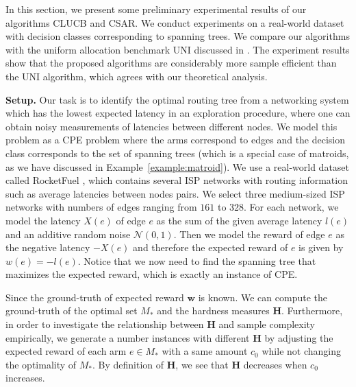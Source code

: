 \documentclass{article}
\newcommand{\Algorithm}{{\small \textsf{CLUCB}}\xspace}
\newcommand{\AlgorithmBud}{{\small \textsf{CSAR}}\xspace}
\newcommand{\Uniform}{{\small \textsf{UNI}}\xspace}
\newcommand{\Problem}{{CPE}\xspace}
\renewcommand{\vec}[1]{\boldsymbol{#1}}
\begin{document}
In this section, we present some preliminary experimental results of our algorithms \Algorithm and \AlgorithmBud. 
We conduct experiments on a real-world dataset with decision classes corresponding to spanning trees.
We compare our algorithms with the uniform allocation benchmark \Uniform discussed in .
The experiment results show that the proposed algorithms are considerably more sample efficient than the \Uniform algorithm, which agrees with our theoretical analysis.


\newcommand{\imgsize}{0.30}

\textbf{Setup.} 
Our task is to identify the optimal routing tree from a networking system which has the lowest expected latency  in an exploration procedure, where one can obtain noisy measurements of latencies between different nodes.
We model this problem as a \Problem problem where the arms correspond to edges and the decision class corresponds to the set of spanning trees (which is a special case of matroids, as we have discussed in Example~\ref{example:matroid}).
We use a real-world dataset called RocketFuel \citep{spring2002measuring}, which contains several ISP networks with routing information such as average latencies between nodes pairs. 
We select three medium-sized ISP networks with numbers of edges ranging from $161$ to 328.
For each network, we model the latency $X(e)$ of edge $e$ as the sum of the given average latency $l(e)$ and an additive random noise $\mathcal N(0, 1)$.
Then we model the reward of edge $e$ as the negative latency $-X(e)$ and therefore the expected reward of $e$ is given by $w(e) = -l(e)$.
Notice that we now need to find the spanning tree that maximizes the expected reward, which is exactly an instance of \Problem. 

Since the ground-truth of expected reward $\vec w$ is known.
We can compute the ground-truth of the optimal set $M_*$ and the hardness measures $\mathbf H$.
Furthermore, in order to investigate the relationship between $\mathbf H$ and sample complexity empirically, we generate a number instances with different $\mathbf H$ by adjusting the expected reward of each arm $e\in M_*$ with a same amount $c_0$ while not changing the optimality of $M_*$.
By definition of $\mathbf H$, we see that $\mathbf H$ decreases when $c_0$ increases.
\end{document}
